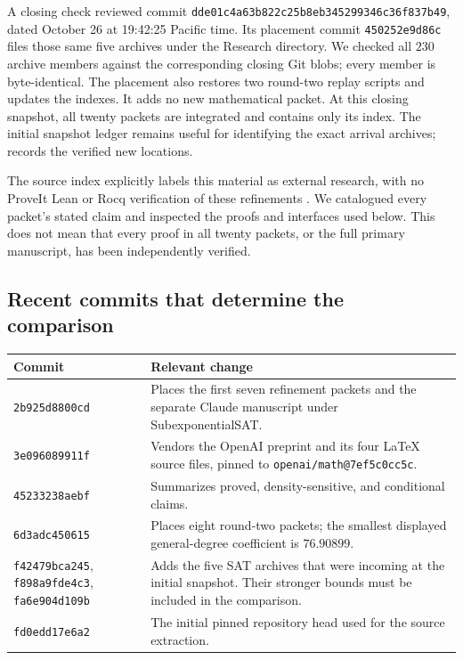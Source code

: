 \documentclass[11pt,letterpaper]{article}
\theoremstyle{remark}\newtheorem{remark}[theorem]{Remark}
\begin{document}
A closing check reviewed commit
\texttt{dde01c4a63b822c25b8eb345299346c36f837b49}, dated October 26 at
19:42:25 Pacific time. Its placement commit \texttt{450252e9d86c}
files those same five archives under the Research directory. We checked
all $230$ archive members against the corresponding closing Git blobs;
every member is byte-identical. The placement also restores two
round-two replay scripts and updates the indexes. It adds no new
mathematical packet. At this closing snapshot, all twenty packets are
integrated and  contains only its index. The initial
snapshot ledger remains useful for identifying the exact arrival
archives;  records the verified
new locations.

The source index explicitly labels this material as external research,
with no ProveIt Lean or Rocq verification of these refinements
\cite{index}. We catalogued every packet's stated claim and inspected the
proofs and interfaces used below. This does not mean that every proof in
all twenty packets, or the full primary manuscript, has been independently
verified.

\subsection{Recent commits that determine the comparison}
\begin{longtable}{@{}>{\raggedright\arraybackslash}p{}p{}@{}}
\toprule Commit & Relevant change\\\midrule\endhead
\texttt{2b925d8800cd} & Places the first seven refinement packets and the separate Claude manuscript under SubexponentialSAT.\\
\texttt{3e096089911f} & Vendors the OpenAI preprint and its four LaTeX source files, pinned to \texttt{openai/math@7ef5c0cc5c}.\\
\texttt{45233238aebf} & Summarizes proved, density-sensitive, and conditional claims.\\
\texttt{6d3adc450615} & Places eight round-two packets; the smallest displayed general-degree coefficient is $76.90899$.\\
\texttt{f42479bca245}, \texttt{f898a9fde4c3}, \texttt{fa6e904d109b} & Adds the five SAT archives that were incoming at the initial snapshot. Their stronger bounds must be included in the comparison.\\
\texttt{fd0edd17e6a2} & The initial pinned repository head used for the source extraction.\\
\bottomrule
\end{longtable}
\end{document}
